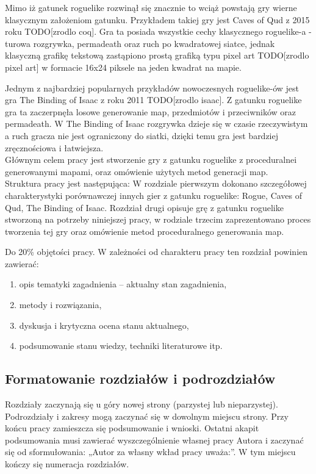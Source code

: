 \documentclass[12pt,twoside]{article}
\begin{document}
Mimo iż gatunek roguelike rozwinął się znacznie to wciąż powstają gry wierne klasycznym założeniom gatunku. Przykładem takiej gry jest Caves of Qud z 2015 roku TODO[zrodlo coq]. Gra ta posiada wszystkie cechy klasycznego roguelike-a - turowa rozgrywka, permadeath oraz ruch po kwadratowej siatce, jednak klasyczną grafikę tekstową zastąpiono prostą grafiką typu pixel art TODO[zrodlo pixel art] w formacie 16x24 piksele na jeden kwadrat na mapie.

Jednym z najbardziej popularnych przykładów nowoczesnych roguelike-ów jest gra The Binding of Isaac z roku 2011 TODO[zrodlo isaac]. Z gatunku roguelike gra ta zaczerpnęła losowe generowanie map, przedmiotów i przeciwników oraz permadeath. W The Binding of Isaac rozgrywka dzieje się w czasie rzeczywistym a ruch gracza nie jest ograniczony do siatki, dzięki temu gra jest bardziej zręcznościowa i łatwiejsza.\\

Głównym celem pracy jest stworzenie gry z gatunku roguelike z proceduralnei generowanymi mapami, oraz omówienie użytych metod generacji map. \\

Struktura pracy jest następująca: W rozdziale pierwszym dokonano szczegółowej charakterystyki porównawczej innych gier z gatunku roguelike: Rogue, Caves of Qud, The Binding of Isaac. Rozdział drugi opisuje grę z gatunku roguelike stworzoną na potrzeby niniejszej pracy, w rodziale trzecim zaprezentowano proces tworzenia tej gry oraz omówienie metod proceduralnego generowania map.

\clearpage

\iffalse
Do 20\% objętości pracy. W zależności od charakteru pracy ten rozdział powinien zawierać:
\begin{enumerate}[label=\alph*), leftmargin=1.25cm]
	\item opis tematyki zagadnienia -- aktualny stan zagadnienia,
	\item metody i rozwiązania,
	\item dyskusja i krytyczna ocena stanu aktualnego,
	\item podsumowanie stanu wiedzy, techniki literaturowe itp.
\end{enumerate}


\subsection{Formatowanie rozdziałów i podrozdziałów}
Rozdziały zaczynają się u góry nowej strony (parzystej lub nieparzystej). Podrozdziały i zakresy mogą zaczynać się w dowolnym miejscu strony. Przy końcu pracy zamieszcza się podsumowanie i wnioski. Ostatni akapit podsumowania musi zawierać wyszczególnienie własnej pracy Autora i zaczynać się od sformułowania: „Autor za własny wkład pracy uważa:”. W tym miejscu kończy się numeracja rozdziałów.
\end{document}
